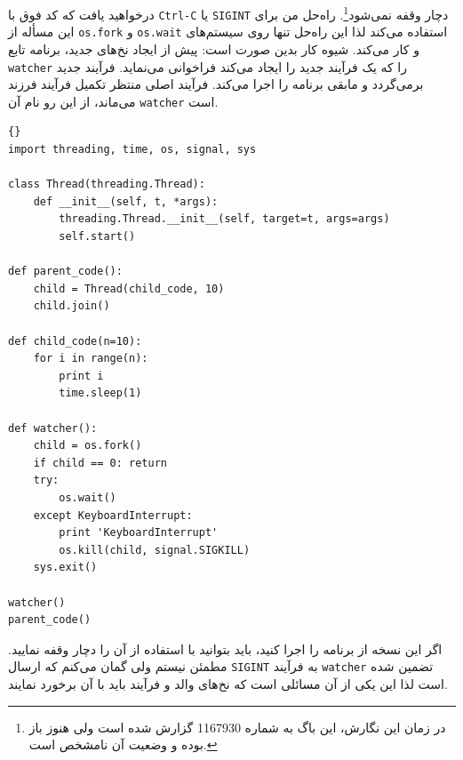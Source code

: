\documentclass{book}
\begin{document}
    درخواهید یافت که کد فوق با {\tt Ctrl-C} یا {\tt SIGINT} دچار وقفه نمی‌شود\footnote{
    در زمان این نگارش، این باگ به شماره 1167930 گزارش شده است ولی هنوز باز بوده و وضعیت آن نامشخص است.  
    }.
    راه‌حل من برای این مسأله از {\tt os.fork} و {\tt os.wait} استفاده می‌کند لذا این راه‌حل تنها روی سیستم‌های  و  
    کار می‌کند. شیوه کار بدین صورت است:‌ پیش از ایجاد نخ‌های جدید، برنامه  تابع  {\tt watcher} را که یک فرآیند جدید را ایجاد می‌کند فراخوانی می‌نماید. 
    فرآیند جدید برمی‌گردد و  مابقی برنامه را اجرا می‌کند. 
    فرآیند اصلی منتظر تکمیل فرآیند فرزند می‌ماند، از این رو نام آن   {\tt watcher} است. 
    

\begin{latin}
\begin{lstlisting}[title={The watcher}]{}
import threading, time, os, signal, sys

class Thread(threading.Thread):
    def __init__(self, t, *args):
        threading.Thread.__init__(self, target=t, args=args)
        self.start()

def parent_code():
    child = Thread(child_code, 10)
    child.join()

def child_code(n=10):
    for i in range(n):
        print i
        time.sleep(1)

def watcher():
    child = os.fork()
    if child == 0: return
    try:
        os.wait()
    except KeyboardInterrupt:
        print 'KeyboardInterrupt'
        os.kill(child, signal.SIGKILL)
    sys.exit()

watcher()
parent_code()
\end{lstlisting}
\end{latin}


    اگر این نسخه از برنامه را اجرا کنید،‌ باید بتوانید با استفاده از  آن را دچار وقفه نمایید. 
    مطمئن نیستم ولی گمان می‌کنم که  ارسال {\tt SIGINT} به فرآیند {\tt watcher} تضمین شده است لذا 
    این یکی از آن مسائلی است که نخ‌های والد و فرآیند باید با آن برخورد نمایند. 
\end{document}
